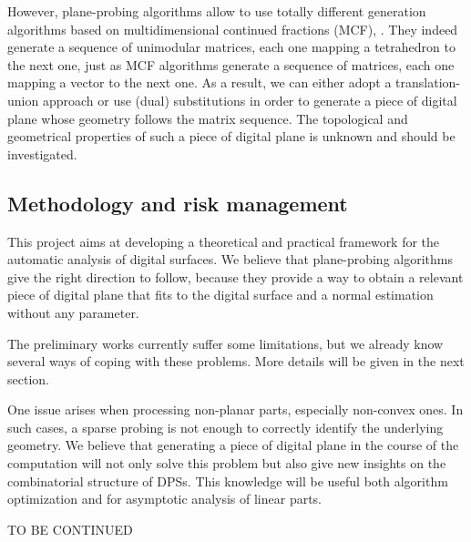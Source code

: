 However, plane-probing algorithms allow to use totally different generation algorithms
based on multidimensional continued fractions (MCF), \eg \cite{Fernique2009,Jamet2016}. 
They indeed generate a sequence of unimodular matrices, each one mapping a tetrahedron to
the next one, just as MCF algorithms generate a sequence of matrices, each one mapping
a vector to the next one. As a result, we can either adopt a translation-union approach \cite{Jamet2016}
or use (dual) substitutions \cite{Fernique2009} in order to generate a piece
of digital plane whose geometry follows the matrix sequence. The topological and geometrical
properties of such a piece of digital plane is unknown and should be investigated. 




\subsection{Methodology and risk management}



This project aims at developing a theoretical and practical framework for the automatic
analysis of digital surfaces. We believe that plane-probing algorithms give the right
direction to follow, because they provide a way to obtain a relevant piece of digital
plane that fits to the digital surface and a normal estimation without any parameter. 

The preliminary works \cite{LPRTCS2016, LPRDGCI2016, LPRJMIV2017}
currently suffer some limitations, but we already know several ways of coping with
these problems. More details will be given in the next section.

One issue arises when processing non-planar parts, especially non-convex ones.
In such cases, a sparse probing is not enough to correctly identify the underlying geometry.
We believe that generating a piece of digital plane in the course of the computation will
not only solve this problem but also give new insights on the combinatorial structure
of DPSs. This knowledge will be useful both algorithm optimization and for asymptotic
analysis of linear parts.   

TO BE CONTINUED


